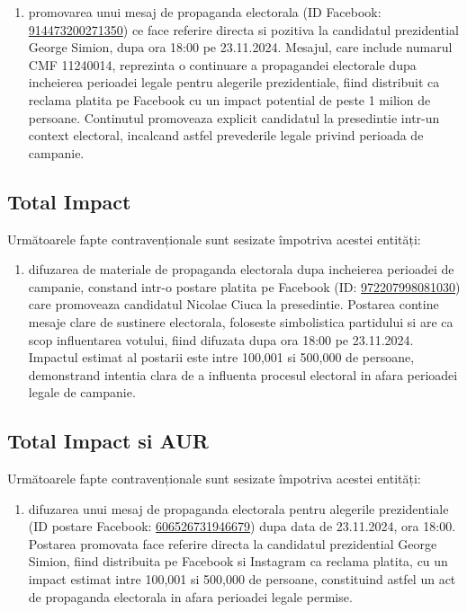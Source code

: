 \documentclass[a4paper,12pt]{article}
\begin{document}
\begin{enumerate}[leftmargin=*, label=\arabic*.)]
    \item promovarea unui mesaj de propaganda electorala (ID Facebook: \href{https://www.facebook.com/ads/library/?id=914473200271350}{914473200271350}) ce face referire directa si pozitiva la candidatul prezidential George Simion, dupa ora 18:00 pe 23.11.2024. Mesajul, care include numarul CMF 11240014, reprezinta o continuare a propagandei electorale dupa incheierea perioadei legale pentru alegerile prezidentiale, fiind distribuit ca reclama platita pe Facebook cu un impact potential de peste 1 milion de persoane. Continutul promoveaza explicit candidatul la presedintie intr-un context electoral, incalcand astfel prevederile legale privind perioada de campanie.
\end{enumerate}

\vspace{0.5cm}

\subsection{Total Impact}
Următoarele fapte contravenționale sunt sesizate împotriva acestei entități:

\begin{enumerate}[leftmargin=*, label=\arabic*.)]
    \item difuzarea de materiale de propaganda electorala dupa incheierea perioadei de campanie, constand intr-o postare platita pe Facebook (ID: \href{https://www.facebook.com/ads/library/?id=972207998081030}{972207998081030}) care promoveaza candidatul Nicolae Ciuca la presedintie. Postarea contine mesaje clare de sustinere electorala, foloseste simbolistica partidului si are ca scop influentarea votului, fiind difuzata dupa ora 18:00 pe 23.11.2024. Impactul estimat al postarii este intre 100,001 si 500,000 de persoane, demonstrand intentia clara de a influenta procesul electoral in afara perioadei legale de campanie.
\end{enumerate}

\vspace{0.5cm}

\subsection{Total Impact si AUR}
Următoarele fapte contravenționale sunt sesizate împotriva acestei entități:

\begin{enumerate}[leftmargin=*, label=\arabic*.)]
    \item difuzarea unui mesaj de propaganda electorala pentru alegerile prezidentiale (ID postare Facebook: \href{https://www.facebook.com/ads/library/?id=606526731946679}{606526731946679}) dupa data de 23.11.2024, ora 18:00. Postarea promovata face referire directa la candidatul prezidential George Simion, fiind distribuita pe Facebook si Instagram ca reclama platita, cu un impact estimat intre 100,001 si 500,000 de persoane, constituind astfel un act de propaganda electorala in afara perioadei legale permise.
\end{enumerate}
\end{document}
